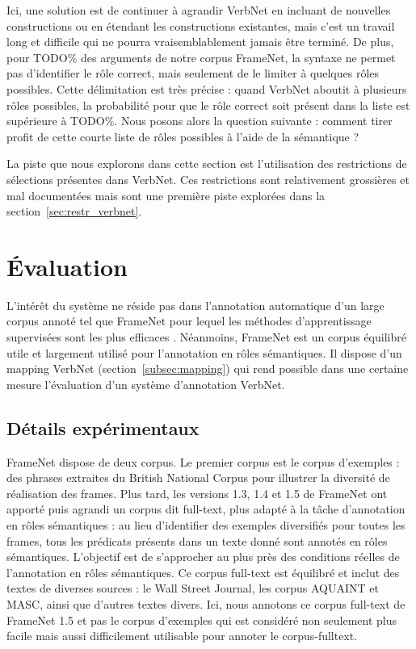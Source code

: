 Ici, une solution est de continuer à agrandir VerbNet en incluant de nouvelles
constructions ou en étendant les constructions existantes, mais c'est un
travail long et difficile qui ne pourra vraisemblablement jamais être terminé.
De plus, pour TODO\% des arguments de notre corpus FrameNet, la syntaxe ne
permet pas d'identifier le rôle correct, mais seulement de le limiter à
quelques rôles possibles. Cette délimitation est très précise : quand VerbNet
aboutit à plusieurs rôles possibles, la probabilité pour que le rôle correct
soit présent dans la liste est supérieure à TODO\%. Nous posons alors la
question suivante : comment tirer profit de cette courte liste de rôles
possibles à l'aide de la sémantique ?

La piste que nous explorons dans cette section est l'utilisation des
restrictions de sélections présentes dans VerbNet. Ces restrictions sont
relativement grossières et mal documentées mais sont une première piste
explorées dans la section~\ref{sec:restr_verbnet}.

\section{Évaluation}
\label{srl:evaluation}

L'intérêt du système ne réside pas dans l'annotation automatique d'un large
corpus annoté tel que FrameNet pour lequel les méthodes d'apprentissage
supervisées sont les plus efficaces \citep{das2014frame}. Néanmoins, FrameNet
est un corpus équilibré utile et largement utilisé pour l'annotation en rôles
sémantiques. Il dispose d'un mapping VerbNet (section~\ref{subsec:mapping}) qui
rend possible dans une certaine mesure l'évaluation d'un système d'annotation
VerbNet.

\subsection{Détails expérimentaux}
\label{subsec:details_exp}

FrameNet dispose de deux corpus. Le premier corpus est le corpus d'exemples :
des phrases extraites du British National Corpus pour illustrer la diversité de
réalisation des frames. Plus tard, les versions 1.3, 1.4 et 1.5 de FrameNet ont
apporté puis agrandi un corpus dit full-text, plus adapté à la tâche
d'annotation en rôles sémantiques : au lieu d'identifier des exemples
diversifiés pour toutes les frames, tous les prédicats présents dans un texte
donné sont annotés en rôles sémantiques. L'objectif est de s'approcher au plus
près des conditions réelles de l'annotation en rôles sémantiques. Ce corpus
full-text est équilibré et inclut des textes de diverses sources : le Wall
Street Journal, les corpus AQUAINT et MASC, ainsi que d'autres textes divers.
Ici, nous annotons ce corpus full-text de FrameNet 1.5 et pas le corpus
d'exemples qui est considéré non seulement plus facile mais aussi difficilement
utilisable pour annoter le corpus-fulltext.

